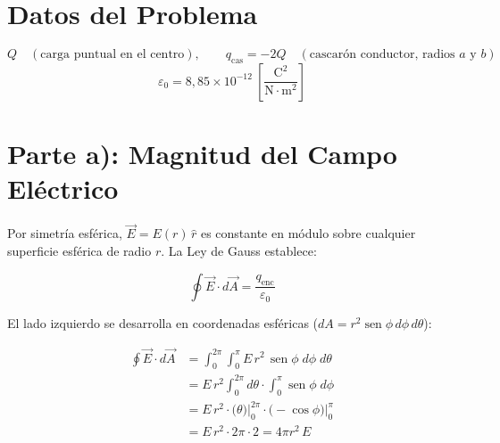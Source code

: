\documentclass[12pt,letterpaper]{article}
\begin{document}
\begin{center}
\end{center}

\section*{Datos del Problema}

\[
    Q \quad (\text{carga puntual en el centro}),
    \qquad
    q_\text{cas} = -2Q \quad (\text{cascar\'on conductor, radios }a\text{ y }b)
\]
\[
    \varepsilon_0 = 8{,}85 \times 10^{-12}
    \ \left[\frac{\text{C}^2}{\text{N}\cdot\text{m}^2}\right]
\]

\section*{Parte a): Magnitud del Campo El\'ectrico}

Por simetr\'ia esf\'erica, $\vec{E} = E(r)\,\hat{r}$ es constante en m\'odulo sobre cualquier
superficie esf\'erica de radio $r$. La Ley de Gauss establece:

\[
    \oint \vec{E}\cdot d\vec{A} = \frac{q_\text{enc}}{\varepsilon_0}
\]

El lado izquierdo se desarrolla en coordenadas esf\'ericas
($dA = r^2\operatorname{sen}\phi\,d\phi\,d\theta$):

\begin{align*}
    \oint \vec{E}\cdot d\vec{A}
        &= \int_0^{2\pi}\!\int_0^{\pi}
           E\,r^2\,\operatorname{sen}\phi\;d\phi\;d\theta \\[4pt]
        &= E\,r^2
           \int_0^{2\pi}\!d\theta
           \cdot
           \int_0^{\pi}\operatorname{sen}\phi\;d\phi \\[4pt]
        &= E\,r^2
           \cdot \bigl(\theta\bigr)\big|_0^{2\pi}
           \cdot \bigl(-\cos\phi\bigr)\big|_0^{\pi} \\[4pt]
        &= E\,r^2 \cdot 2\pi \cdot 2
         = 4\pi r^2\,E
\end{align*}
\end{document}
